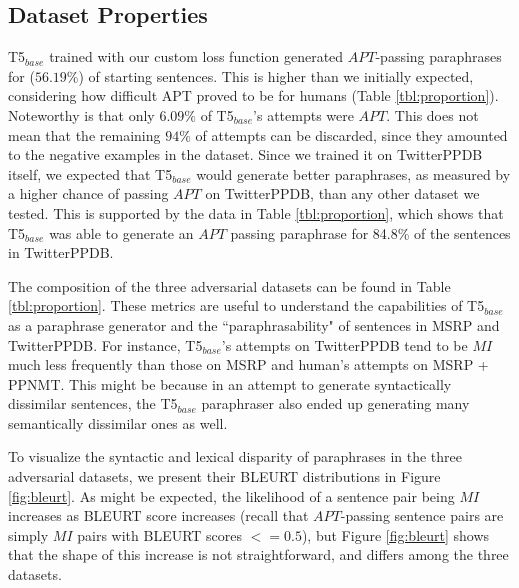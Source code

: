 \vspace{-5pt}
\subsection{Dataset Properties}
T5$_{base}$ trained with our custom loss function generated $APT$-passing paraphrases for ($56.19\%$) of starting sentences. This is higher than we initially expected, considering how difficult APT proved to be for humans (Table \ref{tbl:proportion}). Noteworthy is that only $6.09\%$ of T5$_{base}$'s attempts were $APT$. This does not mean that the remaining $94\%$ of attempts can be discarded, since they amounted to the negative examples in the dataset.
Since we trained it on TwitterPPDB itself, we expected that T5$_{base}$ would generate better paraphrases, as measured by a higher chance of passing $APT$ on TwitterPPDB, than any other dataset we tested. This is supported by the data in Table \ref{tbl:proportion}, which shows that T5$_{base}$ was able to generate an $APT$ passing paraphrase for 84.8\% of the sentences in TwitterPPDB.

The composition of the three adversarial datasets can be found in Table \ref{tbl:proportion}. These metrics are useful to understand the capabilities of T5$_{base}$ as a paraphrase generator and the ``paraphrasability" of sentences in MSRP and TwitterPPDB. For instance, T5$_{base}$'s attempts on TwitterPPDB tend to be $MI$ much less frequently than those on MSRP and human's attempts on MSRP + PPNMT. This might be because in an attempt to generate syntactically dissimilar sentences, the T5$_{base}$ paraphraser also ended up generating many semantically dissimilar ones as well.

To visualize the syntactic and lexical disparity of paraphrases in the three adversarial datasets, we present their BLEURT distributions in Figure \ref{fig:bleurt}. As might be expected, the likelihood of a sentence pair being $MI$ increases as BLEURT score increases (recall that $APT$-passing sentence pairs are simply $MI$ pairs with BLEURT scores $<= 0.5$), but Figure \ref{fig:bleurt} shows that the shape of this increase is not straightforward, and differs among the three datasets. 



